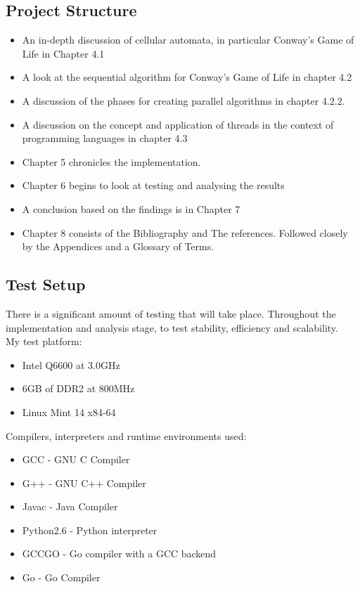 \documentclass[11pt]{article} %
\begin{document}
\subsection{Project Structure}
\begin{itemize}
\item An in-depth discussion of cellular automata, in particular Conway's Game of Life in Chapter 4.1
\item A look at the sequential algorithm for Conway's Game of Life in chapter 4.2
\item A discussion of the phases for creating parallel algorithms in chapter 4.2.2.
\item A discussion on the concept and application of threads in the context of programming languages in chapter 4.3
\item Chapter 5 chronicles the implementation.
\item Chapter 6 begins to look at testing and analysing the results
\item A conclusion based on the findings is in Chapter 7
\item Chapter 8 consists of the Bibliography and The references. Followed closely by the Appendices and a Glossary of Terms.
\end{itemize}
\subsection{Test Setup}
There is a significant amount of testing that will take place. Throughout the implementation and analysis stage, to test stability, efficiency and scalability.
\smallskip
\\My test platform:
\begin{itemize}
\item Intel Q6600 at 3.0GHz
\item 6GB of DDR2 at 800MHz
\item Linux Mint 14 x84-64
\end{itemize} 
Compilers, interpreters and runtime environments used:
\begin{itemize}
\item \gls{GCC} - GNU C Compiler
\item G++ - GNU C++ Compiler
\item Javac - Java Compiler 
\item Python2.6 - Python interpreter
\item GCCGO - Go compiler with a GCC backend
\item Go - Go Compiler
\end{itemize}
\end{document}
